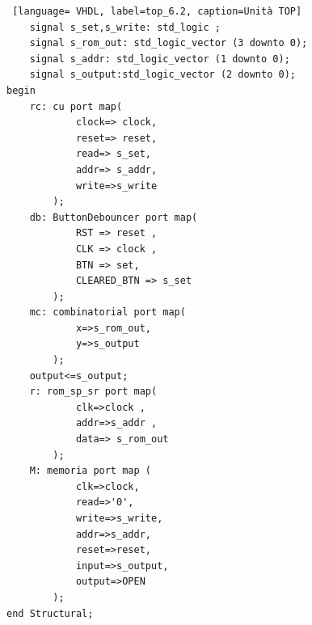 \begin{lstlisting} [language= VHDL, label=top_6.2, caption=Unità TOP]
    signal s_set,s_write: std_logic ;
    signal s_rom_out: std_logic_vector (3 downto 0);
    signal s_addr: std_logic_vector (1 downto 0);
    signal s_output:std_logic_vector (2 downto 0);
begin
    rc: cu port map(
            clock=> clock,
            reset=> reset,
            read=> s_set,
            addr=> s_addr,
            write=>s_write
        );
    db: ButtonDebouncer port map(
            RST => reset ,
            CLK => clock ,
            BTN => set,
            CLEARED_BTN => s_set
        );
    mc: combinatorial port map(
            x=>s_rom_out,
            y=>s_output
        );
    output<=s_output;
    r: rom_sp_sr port map(
            clk=>clock ,
            addr=>s_addr ,
            data=> s_rom_out
        );
    M: memoria port map (
            clk=>clock,
            read=>'0',
            write=>s_write,
            addr=>s_addr,
            reset=>reset,
            input=>s_output,
            output=>OPEN
        );
end Structural;
\end{lstlisting}